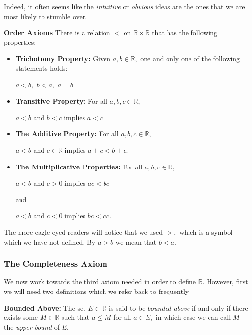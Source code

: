 Indeed, it often seems like the \emph{intuitive} or \emph{obvious} ideas are the ones that we are most likely to stumble over.

\begin{definition} \textbf{Order Axioms}\newline
There is a relation $<$ on $\mathbb{R} \times \mathbb{R}$ that has the following properties:
\begin{itemize}

\item \textbf{Trichotomy Property:} Given $a,b \in \mathbb{R},$ one and only one of the following statements holds: \begin{center}
$a<b,$  $b<a,$  $a=b$
\end{center}
\item \textbf{Transitive Property:} For all $a,b,c \in \mathbb{R},$
\begin{center}
$a<b$ and $b<c$ implies $a<c$
\end{center}
\item \textbf{The Additive Property:} For all $a,b,c \in \mathbb{R},$
\begin{center}
$a<b$ and $c\in \mathbb{R}$ implies $a+c < b+c.$
\end{center}
\item \textbf{The Multiplicative Properties:} For all $a,b,c \in \mathbb{R},$
\begin{center}
$a<b$ and $c>0$ implies $ac < bc$
\end{center}
and
\begin{center}
$a<b$ and $c<0$ implies $bc < ac.$
\end{center}
\end{itemize}
\end{definition}

The more eagle-eyed readers will notice that we used $>,$ which is a symbol which we have not defined. By $a>b$ we mean that $b<a.$\newline


\subsubsection{The Completeness Axiom}

We now work towards the third axiom needed in order to define $\mathbb{R}.$ However, first we will need two definitions which we refer back to frequently.

\begin{definition}
\textbf{Bounded Above:} The set $E\subset \mathbb{R}$ is said to be \emph{bounded above} if and only if there exists some $M \in \mathbb{R}$ such that $a\leq M$ for all $a\in E,$ in which case we can call $M$ the \emph{upper bound} of $E.$
\end{definition}

